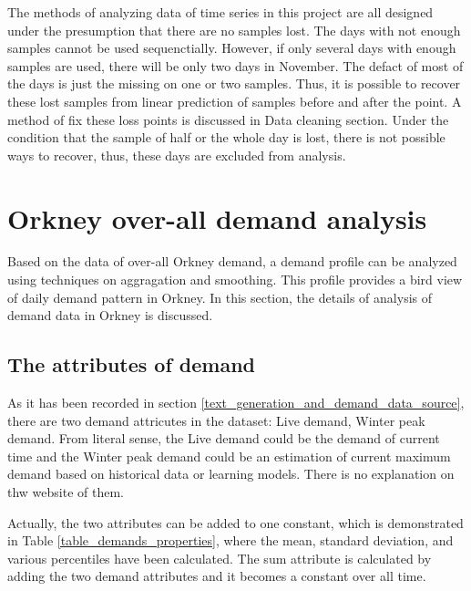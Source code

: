 \documentclass[12pt,a4paper]{report}
\begin{document}
                The methods of analyzing data of time series in this project are all designed under the presumption that there are no samples lost. The days with not enough samples cannot be
                used sequenctially. However, if only several days with enough samples are used, there will be only two days in November. The defact of most of the days is just the missing on
                one or two samples. Thus, it is possible to recover these lost samples from linear prediction of samples before and after the point. A method of fix these loss points is discussed
                in Data cleaning section. Under the condition that the sample of half or the whole day is lost, there is not possible ways to recover, thus, these days are excluded from
                analysis.
            
                
        \section{Orkney over-all demand analysis}
        Based on the data of over-all Orkney demand, a demand profile can be analyzed using techniques on aggragation and smoothing. This profile provides a bird view of daily demand pattern in Orkney.
        In this section, the details of analysis of demand data in Orkney is discussed.

                \subsection{The attributes of demand}
                \label{text_attributs_of_demand}
                As it has been recorded in section \ref{text_generation_and_demand_data_source}, there are two demand attricutes in the dataset: Live demand, Winter peak demand. From literal sense, the 
                Live demand could be the demand of current time and the Winter peak demand could be an estimation of current maximum demand based on historical data or learning models. There is no explanation
                on thw website of them.
                
                Actually, the two attributes can be added to one constant, which is demonstrated in Table \ref{table_demands_properties}, where the mean, standard deviation, and various percentiles have been calculated.
                The sum attribute is calculated by adding the two demand attributes and it becomes a constant over all time.
\end{document}
